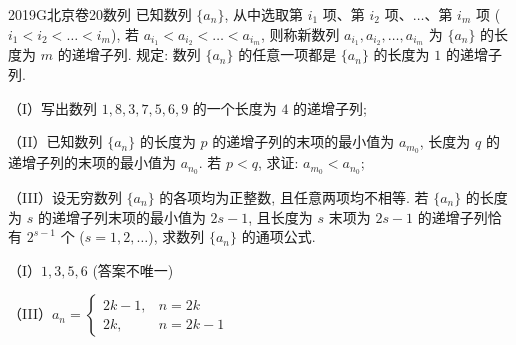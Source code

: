 
\begin{problem}{2019}{G}{北京卷}{20}{数列}
已知数列 $\{a_n\}$, 从中选取第 $i_1$ 项、第 $i_2$ 项、$\dots$、第 $i_m$ 项 ($i_1 < i_2 < \dots < i_m$), 若 $a_{i_1} < a_{i_2} < \dots < a_{i_m}$, 则称新数列 $a_{i_1}, a_{i_2}, \dots, a_{i_m}$ 为 $\{a_n\}$ 的长度为 $m$ 的递增子列. 规定: 数列 $\{a_n\}$ 的任意一项都是 $\{a_n\}$ 的长度为 $1$ 的递增子列.

（I）写出数列 $1,8,3,7,5,6,9$ 的一个长度为 $4$ 的递增子列;

（II）已知数列 $\{a_n\}$ 的长度为 $p$ 的递增子列的末项的最小值为 $a_{m_0}$, 长度为 $q$ 的递增子列的末项的最小值为 $a_{n_0}$. 若 $p < q$, 求证: $a_{m_0} < a_{n_0}$;

（III）设无穷数列 $\{a_n\}$ 的各项均为正整数, 且任意两项均不相等. 若 $\{a_n\}$ 的长度为 $s$ 的递增子列末项的最小值为 $2s-1$, 且长度为 $s$ 末项为 $2s-1$ 的递增子列恰有 $2^{s-1}$ 个 ($s=1,2,\dots$), 求数列 $\{a_n\}$ 的通项公式.
\end{problem}

\begin{answer}
（I）$1,3,5,6$ (答案不唯一)

（III）$a_n = \begin{cases} 2k-1, & n=2k \\ 2k, & n=2k-1 \end{cases}$
\end{answer}

